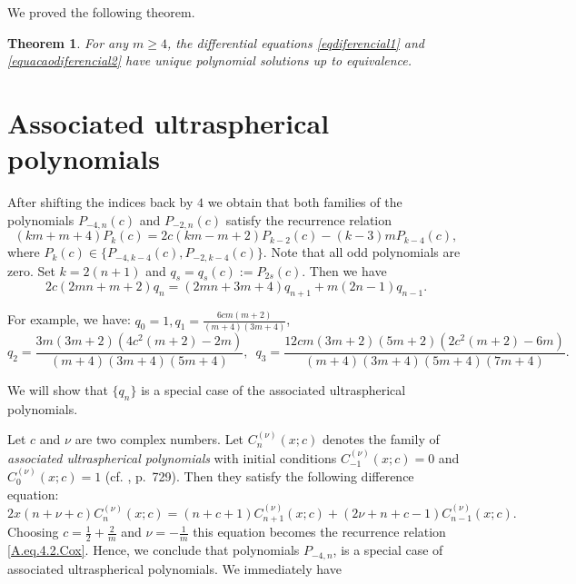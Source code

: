 \documentclass[review,nopreprintline]{elsarticle}
\newtheorem{theorem}{Theorem}[section]
\theoremstyle{definition}
\numberwithin{equation}{section}
\theoremstyle{remark}
\begin{document}
	       
	            We proved the following theorem.
	
	            \begin{theorem} For any $m\geq 4$, 
	                the differential equations \eqref{eqdiferencial1} and \eqref{equacaodiferencial2} 
	               have  unique  polynomial solutions up to equivalence.
	            \end{theorem}
	    
	\section{Associated ultraspherical polynomials}
	
	    After shifting the indices back by $4$ we obtain that both families of the polynomials $P_{-4,n}(c)$ and $P_{-2,n}(c)$ satisfy the recurrence relation
	    \begin{equation}
	        (k m+m+4) P_k(c)=2 c (km-m+2)P_{k-2}(c)-(k-3) m P_{k-4}(c),
	    \end{equation}
	    where $P_k(c)\in \{P_{-4,k-4}(c), P_{-2,k-4}(c)\}$. 
	    Note that all odd polynomials are zero. Set $k=2(n+1)$ and $q_s=q_s(c):=P_{2s}(c)$. Then we have
	    \begin{equation}
	        2 c (2 m n+m+2) q_n=(2m n+3m+4) q_{n+1}+m (2 n-1) q_{n-1}. 
	        \label{A.eq.4.2.Cox}
	    \end{equation}
	    
	    For example, we have:  $q_{0} =1, 
	            q_1=\frac{6 c m (m+2) }{(m+4) (3 m+4)}$, 
	$$
	  q_2=\frac{3 m (3 m+2) \left(4 c^2 (m+2) -2m \right)}{(m+4) (3 m+4) (5 m+4)}, \,\,\,
	            q_3=\frac{12cm (3 m+2)(5 m+2)  \left(2 c^2 (m+2) -6m \right)}{(m+4) (3 m+4) (5 m+4) (7 m+4)}.$$
	     
	    
	    We will show that $\{q_n\}$ is a special case of the associated ultraspherical polynomials.
	        
	    Let $c$ and $\nu$ are two complex numbers. Let $C_n^{(\nu)}(x;c)$ denotes the family of \textit{associated ultraspherical polynomials} with initial conditions $C_{-1}^{(\nu)}(x;c)=0$ and $C_{0}^{(\nu)}(x;c)=1$ (cf. \cite{BustozIsmail1982}, p.~729). Then they  satisfy the following difference equation:
	    \begin{equation}
	        2x(n+\nu+c)C_{n}^{(\nu)}(x;c)=(n+c+1)C_{n+1}^{(\nu)}(x;c)+(2\nu+n+c-1)C_{n-1}^{(\nu)}(x;c).
	    \end{equation}
	    Choosing $c=\frac{1}{2}+\frac{2}{m}$ and $\nu=-\frac{1}{m}$ this equation becomes the  recurrence relation  \eqref{A.eq.4.2.Cox}. Hence, we conclude that polynomials $P_{-4,n}$, is a special case of associated ultraspherical polynomials. We immediately have
	    
\end{document}
